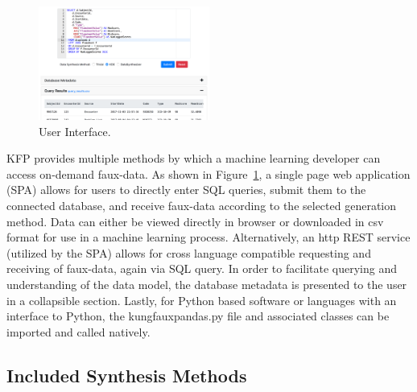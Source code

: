 \documentclass{article}
\begin{document}
\begin{figure}%
  \centering
  \includegraphics[width=0.5\textwidth]{ui_screenshot3}
  \caption{User Interface.}
  \label{fig:ui}
\end{figure}
KFP provides multiple methods by which a machine learning developer can access on-demand faux-data. As shown in Figure~\ref{fig:ui}, a single page web application (SPA) allows for users to directly enter SQL queries, submit them to the connected database, and receive faux-data according to the selected generation method. Data can either be viewed directly in browser or downloaded in csv format for use in a machine learning process. Alternatively, an http REST service (utilized by the SPA) allows for cross language compatible requesting and receiving of faux-data, again via SQL query. In order to facilitate querying and understanding of the data model, the database metadata is presented to the user in a collapsible section. Lastly, for Python based software or languages with an interface to Python, the kungfauxpandas.py file and associated classes can be imported and called natively.

\subsection{Included Synthesis Methods}
\end{document}
